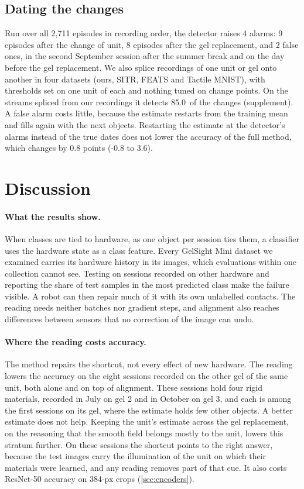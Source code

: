 \subsection{Dating the changes}
\label{sec:trackerexp}

Run over all 2,711 episodes in recording order, the detector raises 4 alarms: 9 episodes after the change of unit, 8 episodes after the gel replacement, and 2 false ones, in the second September session after the summer break and on the day before the gel replacement. We also splice recordings of one unit or gel onto another in four datasets (ours, SITR, FEATS and Tactile MNIST), with thresholds set on one unit of each and nothing tuned on change points. On the streams spliced from our recordings it detects 85.0\pct\ of the changes (supplement). A false alarm costs little, because the estimate restarts from the training mean and fills again with the next objects. Restarting the estimate at the detector's alarms instead of the true dates does not lower the accuracy of the full method, which changes by 0.8 points (-0.8 to 3.6).

\section{Discussion}
\label{sec:discussion}

\paragraph{What the results show.}
When classes are tied to hardware, as one object per session ties them, a classifier uses the hardware state as a class feature. Every GelSight Mini dataset we examined carries its hardware history in its images, which evaluations within one collection cannot see. Testing on sessions recorded on other hardware and reporting the share of test samples in the most predicted class make the failure visible. A robot can then repair much of it with its own unlabelled contacts. The reading needs neither batches nor gradient steps, and alignment also reaches differences between sensors that no correction of the image can undo.

\paragraph{Where the reading costs accuracy.}
The method repairs the shortcut, not every effect of new hardware. The reading lowers the accuracy on the eight sessions recorded on the other gel of the same unit, both alone and on top of alignment. These sessions hold four rigid materials, recorded in July on gel 2 and in October on gel 3, and each is among the first sessions on its gel, where the estimate holds few other objects. A better estimate does not help. Keeping the unit's estimate across the gel replacement, on the reasoning that the smooth field belongs mostly to the unit, lowers this stratum further. On these sessions the shortcut points to the right answer, because the test images carry the illumination of the unit on which their materials were learned, and any reading removes part of that cue. It also costs ResNet-50 accuracy on 384-px crops (\cref{sec:encoders}).

